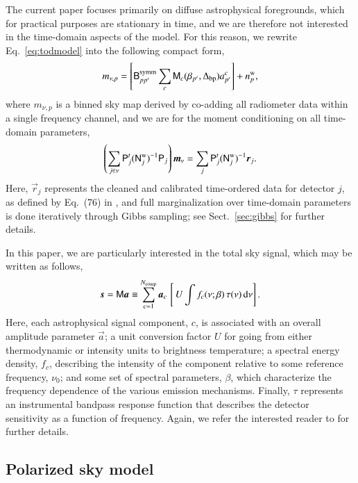 \documentclass[twocolumn]{aa}
\newcommand{\s}[0]{\vec{s}}
\renewcommand{\a}[0]{\vec{a}}
\newcommand{\m}[0]{\vec{m}}
\newcommand{\B}[0]{\tens{B}}
\newcommand{\N}[0]{\tens{N}}
\newcommand{\M}[0]{\tens{M}}
\renewcommand{\r}[0]{\vec{r}}
\renewcommand{\P}[0]{\tens{P}}
\newcommand{\Dbp}[0]{\Delta_{\mathrm{bp}}}
\newcommand{\?}[1]{\textcolor{red}{{\bf [#1]}}}
\begin{document}
The current paper focuses primarily on diffuse astrophysical
foregrounds, which for practical purposes are stationary in time,
and we are therefore not interested in the time-domain aspects of
the model. For this reason, we rewrite Eq.~\eqref{eq:todmodel} into
the following compact form,
\begin{equation}
  m_{\nu,p} = \left[\B^{\mathrm{symm}}_{pp'}\sum_{c}
    \M_{c}(\beta_{p'}, \Dbp)a^c_{p'}\right] + n^{\mathrm{w}}_{p},
  \label{eq:mapmodel}
\end{equation}
where $m_{\nu,p}$ is a binned sky map derived by co-adding all
radiometer data within a single frequency channel, and we are for the
moment conditioning on all time-domain parameters,
\begin{equation}
\left(\sum_{j \in \nu} \P_j^t (\N^{\mathrm{w}}_{j})^{-1} \P_j\right) \m_{\nu} =
\sum_j \P_j^t (\N^{\mathrm{w}}_j)^{-1}\r_j.
\label{eq:binmap}
\end{equation}
Here, $\r_j$ represents the cleaned and calibrated time-ordered data for
detector $j$, as defined by Eq.~(76) in \citet{bp01}, and full
marginalization over time-domain parameters is done iteratively
through Gibbs sampling; see Sect.~\ref{sec:gibbs} for further details.

In this paper, we are particularly interested in the total sky signal,
which may be written as follows,
\begin{equation}
  \s = \M\a \equiv \sum_{c=1}^{N_{\mathrm{comp}}}\a_c\, \left[\,U \int f_c(\nu; \beta)\,
    \tau(\nu)\,\mathrm d\nu\right].
  \label{eq:mixmat}
\end{equation}
Here, each astrophysical signal component, $c$, is associated with an
overall amplitude parameter $\a$; a unit conversion factor $U$ for
going from either thermodynamic or intensity units to brightness
temperature; a spectral energy density, $f_c$, describing the
intensity of the component relative to some reference frequency,
$\nu_{\mathrm{0}}$; and some set of spectral parameters, $\beta$,
which characterize the frequency dependence of the various emission
mechanisms. Finally, $\tau$ represents an instrumental bandpass
response function that describes the detector sensitivity as a
function of frequency. Again, we refer the interested reader to
\citet{bp01} for further details.

\subsection{Polarized sky model}
\end{document}
